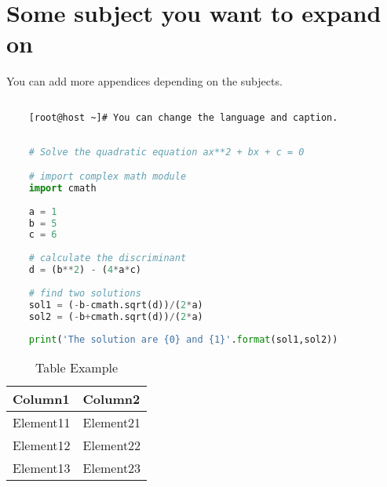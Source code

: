 \chapter{Some subject you want to expand on}
\label{chap:Some subject you want to expand on} 


You can add more appendices depending on the subjects.
    
    \lstset{style=mystyle} %
    
    \begin{lstlisting}[language=bash, caption= Bash example]
    
    [root@host ~]# You can change the language and caption.

    \end{lstlisting}



    \begin{lstlisting}[language=python, caption= Python example]
    
    # Solve the quadratic equation ax**2 + bx + c = 0

    # import complex math module
    import cmath
    
    a = 1
    b = 5
    c = 6
    
    # calculate the discriminant
    d = (b**2) - (4*a*c)
    
    # find two solutions
    sol1 = (-b-cmath.sqrt(d))/(2*a)
    sol2 = (-b+cmath.sqrt(d))/(2*a)
    
    print('The solution are {0} and {1}'.format(sol1,sol2))

    \end{lstlisting}



\begin{table}[H]
    \centering
    \begin{tabular}{|m{5cm}|m{10cm}|}
        \hline
          Column1 & Column2 \\
        \hline
          Element11 & Element21 \\
        \hline
          Element12 & Element22 \\
        \hline
          Element13 & Element23 \\
        \hline
    \end{tabular}
    \caption{Table Example}
\end{table}




